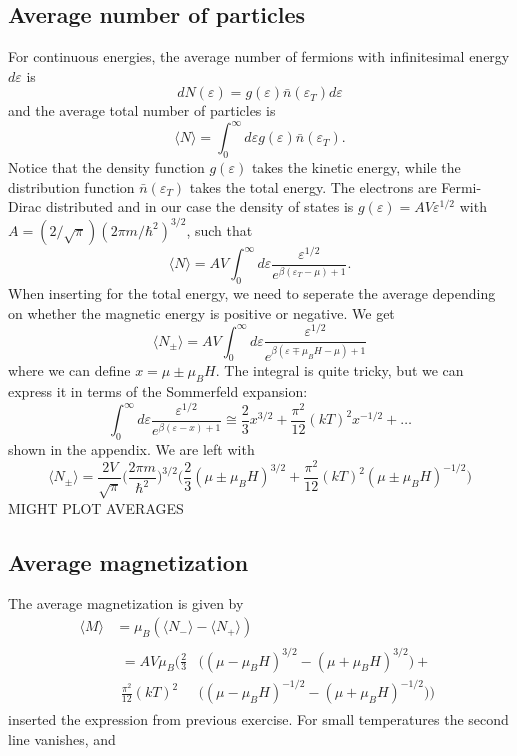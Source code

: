 \documentclass[norsk,a4paper,12pt]{article}
\begin{document}
\subsection{Average number of particles}
For continuous energies, the average number of fermions with infinitesimal energy $d\varepsilon$ is
\begin{equation}
dN(\varepsilon)=g(\varepsilon)\bar{n}(\varepsilon_T)d\varepsilon
\end{equation}
and the average total number of particles is 
\begin{equation}
\langle N\rangle=\int_0^{\infty}d\varepsilon g(\varepsilon)\bar{n}(\varepsilon_T).
\end{equation}
Notice that the density function $g(\varepsilon)$ takes the kinetic energy, while the distribution function $\bar{n}(\varepsilon_T)$ takes the total energy. The electrons are Fermi-Dirac distributed and in our case the density of states is
$g(\varepsilon)=AV\varepsilon^{1/2}$ with $A=(2/\sqrt{\pi})(2\pi m/\hbar^2)^{3/2}$, such that 
\begin{equation}
\langle N\rangle=AV\int_0^{\infty}d\varepsilon\frac{\varepsilon^{1/2}}{e^{\beta(\varepsilon_T-\mu)+1}}.
\end{equation}
When inserting for the total energy, we need to seperate the average depending on whether the magnetic energy is positive or negative. We get
\begin{equation}
\langle N_{\pm}\rangle=AV\int_0^{\infty}d\varepsilon\frac{\varepsilon^{1/2}}{e^{\beta(\varepsilon\mp\mu_BH-\mu)+1}}
\end{equation}
where we can define $x=\mu\pm\mu_BH$. The integral is quite tricky, but we can express it in terms of the Sommerfeld expansion:
\begin{equation}
\int_0^{\infty}d\varepsilon\frac{\varepsilon^{1/2}}{e^{\beta(\varepsilon-x)+1}}\cong\frac{2}{3}x^{3/2}+\frac{\pi^2}{12}(kT)^2x^{-1/2}+\hdots
\end{equation}
shown in the appendix. We are left with
\begin{equation}
\langle N_{\pm}\rangle=\frac{2V}{\sqrt{\pi}}\bigg(\frac{2\pi m}{\hbar^2}\bigg)^{3/2}\bigg(\frac{2}{3}(\mu\pm\mu_BH)^{3/2}+\frac{\pi^2}{12}(kT)^2(\mu\pm\mu_BH)^{-1/2}\bigg)
\end{equation}
MIGHT PLOT AVERAGES

\subsection{Average magnetization}
The average magnetization is given by
\begin{align}
\langle M\rangle&=\mu_B(\langle N_-\rangle-\langle N_+\rangle)\\
&
\begin{aligned}
=AV\mu_B\bigg(\frac{2}{3}&\Big((\mu-\mu_BH)^{3/2}-(\mu+\mu_BH)^{3/2}\Big)+\\
\frac{\pi^2}{12}(kT)^2&\Big((\mu-\mu_BH)^{-1/2}-(\mu+\mu_BH)^{-1/2}\Big)\bigg)
\end{aligned}
\end{align}
inserted the expression from previous exercise. For small temperatures the second line vanishes, and 
\end{document}
